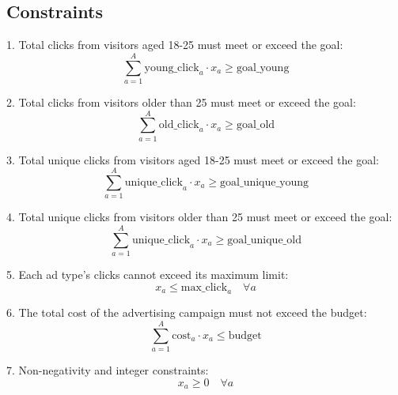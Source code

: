 \documentclass{article}
\begin{document}
\subsection*{Constraints}
1. Total clicks from visitors aged 18-25 must meet or exceed the goal:
\[
\sum_{a=1}^{A} \text{young\_click}_{a} \cdot x_a \geq \text{goal\_young}
\]

2. Total clicks from visitors older than 25 must meet or exceed the goal:
\[
\sum_{a=1}^{A} \text{old\_click}_{a} \cdot x_a \geq \text{goal\_old}
\]

3. Total unique clicks from visitors aged 18-25 must meet or exceed the goal:
\[
\sum_{a=1}^{A} \text{unique\_click}_{a} \cdot x_a \geq \text{goal\_unique\_young}
\]

4. Total unique clicks from visitors older than 25 must meet or exceed the goal:
\[
\sum_{a=1}^{A} \text{unique\_click}_{a} \cdot x_a \geq \text{goal\_unique\_old}
\]

5. Each ad type's clicks cannot exceed its maximum limit:
\[
x_a \leq \text{max\_click}_{a} \quad \forall a
\]

6. The total cost of the advertising campaign must not exceed the budget:
\[
\sum_{a=1}^{A} \text{cost}_{a} \cdot x_a \leq \text{budget}
\]

7. Non-negativity and integer constraints:
\[
x_a \geq 0 \quad \forall a
\]
\end{document}
